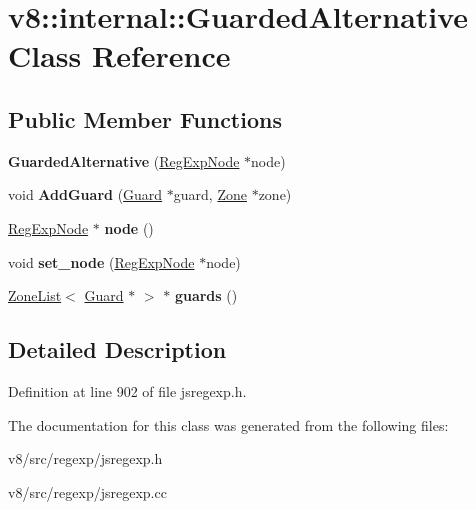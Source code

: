 \hypertarget{classv8_1_1internal_1_1GuardedAlternative}{}\section{v8\+:\+:internal\+:\+:Guarded\+Alternative Class Reference}
\label{classv8_1_1internal_1_1GuardedAlternative}
\subsection*{Public Member Functions}
\begin{DoxyCompactItemize}
\item 
\mbox{\label{classv8_1_1internal_1_1GuardedAlternative_a9301c0773fc8f7eb8d3672ac455fef8d}} 
{\bfseries Guarded\+Alternative} (\mbox{\hyperlink{classv8_1_1internal_1_1RegExpNode}{Reg\+Exp\+Node}} $\ast$node)
\item 
\mbox{\label{classv8_1_1internal_1_1GuardedAlternative_a3434f11f5f3088a4398a455795c4d316}} 
void {\bfseries Add\+Guard} (\mbox{\hyperlink{classv8_1_1internal_1_1Guard}{Guard}} $\ast$guard, \mbox{\hyperlink{classv8_1_1internal_1_1Zone}{Zone}} $\ast$zone)
\item 
\mbox{\label{classv8_1_1internal_1_1GuardedAlternative_a19067cf32a9fe1de6d6b9e4ceb08592c}} 
\mbox{\hyperlink{classv8_1_1internal_1_1RegExpNode}{Reg\+Exp\+Node}} $\ast$ {\bfseries node} ()
\item 
\mbox{\label{classv8_1_1internal_1_1GuardedAlternative_a44d556e4c3f0aaa9ebb23d57ec638409}} 
void {\bfseries set\+\_\+node} (\mbox{\hyperlink{classv8_1_1internal_1_1RegExpNode}{Reg\+Exp\+Node}} $\ast$node)
\item 
\mbox{\label{classv8_1_1internal_1_1GuardedAlternative_ace77bbc81d1cfb1c9b1dd9f71f98c7e6}} 
\mbox{\hyperlink{classv8_1_1internal_1_1ZoneList}{Zone\+List}}$<$ \mbox{\hyperlink{classv8_1_1internal_1_1Guard}{Guard}} $\ast$ $>$ $\ast$ {\bfseries guards} ()
\end{DoxyCompactItemize}


\subsection{Detailed Description}


Definition at line 902 of file jsregexp.\+h.



The documentation for this class was generated from the following files\+:\begin{DoxyCompactItemize}
\item 
v8/src/regexp/jsregexp.\+h\item 
v8/src/regexp/jsregexp.\+cc\end{DoxyCompactItemize}
